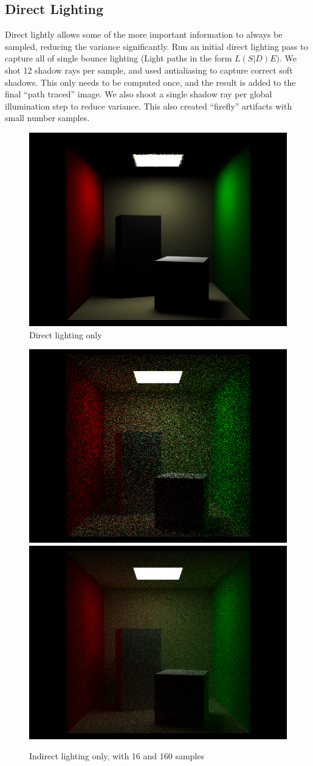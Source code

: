 \documentclass[11pt]{article}
\begin{document}
\subsection{Direct Lighting}
Direct lightly allows some of the more important information to always be sampled, reducing the variance significantly. Run an initial direct lighting pass to capture all of single bounce lighting (Light paths in the form $L(S|D)E)$. We shot 12 shadow rays per sample, and used antialiasing to capture correct soft shadows. This only needs to be computed once, and the result is added to the final ``path traced'' image. We also shoot a single shadow ray per global illumination step to reduce variance. This also created ``firefly'' artifacts with small number samples.

\begin{figure}
  \begin{center}
    \includegraphics[width=.5\linewidth]{figs/direct_only_cornell}
  \end{center}
  \caption{Direct lighting only}
\end{figure}

\begin{figure}
  \begin{center}
  \includegraphics[width=.4\linewidth]{figs/indirect_only_1sample}
  \includegraphics[width=.4\linewidth]{figs/indirect_only_10sample}
  \end{center}
  \caption{Indirect lighting only, with 16 and 160 samples}
\end{figure}
\end{document}
